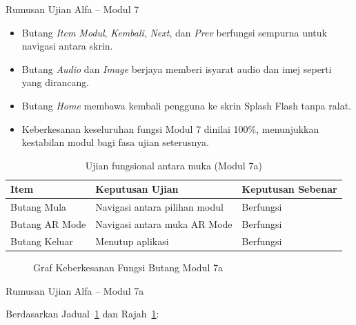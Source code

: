 {{Rumusan Ujian Alfa – Modul 7

\begin{itemize}[h]
  \item Butang \textit{Item Modul}, \textit{Kembali}, \textit{Next}, dan \textit{Prev} berfungsi sempurna untuk navigasi antara skrin.
  \item Butang \textit{Audio} dan \textit{Image} berjaya memberi isyarat audio dan imej seperti yang dirancang.
  \item Butang \textit{Home} membawa kembali pengguna ke skrin Splash Flash tanpa ralat.
  \item Keberkesanan keseluruhan fungsi Modul 7 dinilai 100\%, menunjukkan kestabilan modul bagi fasa ujian seterusnya.
\end{itemize}

\clearpage

\begin{table}[h]
\centering
\caption{Ujian fungsional antara muka (Modul 7a)}
\label{jadual-5-9}
\begin{tabular}{lll}
\toprule
\textbf{Item} & \textbf{Keputusan Ujian} & \textbf{Keputusan Sebenar} \\ \midrule
Butang Mula & Navigasi antara pilihan modul & Berfungsi \\ 
Butang AR Mode & Navigasi antara muka AR Mode & Berfungsi \\ 
Butang Keluar & Menutup aplikasi & Berfungsi \\ \bottomrule
\end{tabular}
\end{table}

\begin{figure}[h]
\centering
{}
\caption{Graf Keberkesanan Fungsi Butang Modul 7a}
\label{rajah-5-9}
\end{figure}

Rumusan Ujian Alfa – Modul 7a

Berdasarkan Jadual~\ref{jadual-5-9} dan Rajah~\ref{rajah-5-9}:

}}
